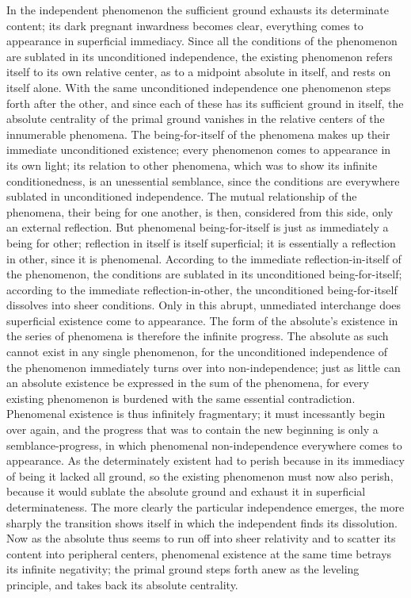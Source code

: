\documentclass[12pt,a4paper,openany]{book}
\newcommand{\opage}[1]{\marginnote{\footnotesize\textit{[#1]}}}
\begin{document}
In the independent phenomenon the sufficient
ground exhausts its determinate content; its dark pregnant
inwardness becomes clear, everything comes to appearance in
superficial immediacy. Since all the conditions of the phenomenon are sublated in its unconditioned independence,
the existing phenomenon refers itself to its own
relative center, as to a midpoint absolute in itself,
and rests on itself alone. With the same unconditioned
independence one phenomenon steps forth after the
other, and since each of these has its sufficient
ground in itself, the absolute centrality of the primal ground vanishes
in the relative centers of the innumerable phenomena.
The being-for-itself of the phenomena makes up their immediate
unconditioned existence; every phenomenon comes to appearance
in its own light; its relation to other phenomena,
which was to show its infinite conditionedness, is an unessential
semblance, since the conditions are everywhere sublated
in unconditioned independence. The mutual
relationship of the phenomena, their being for one another, is then, considered from
this side, only an external reflection.
But phenomenal being-for-itself is just as immediately
a being for other; reflection in itself is itself
superficial; it is essentially a reflection in other,
since it is phenomenal. According to the immediate
reflection-in-itself of the phenomenon, the conditions are sublated in
its unconditioned being-for-itself; according to the immediate
reflection-in-other, the unconditioned being-for-itself dissolves
into sheer conditions. Only in this abrupt, unmediated
interchange does superficial existence come to appearance.
The form of the absolute's existence in the series
of phenomena is therefore the infinite progress. The absolute
as such cannot exist in any single phenomenon,
for the unconditioned independence of the phenomenon
\setcounter{footnote}{0}%
\opage{161}immediately turns over into non-independence; just as little can an absolute
existence be expressed in the sum of the phenomena, for
every existing phenomenon is burdened with the same
essential contradiction. Phenomenal existence
is thus infinitely fragmentary; it must incessantly
begin over again, and the progress that was to contain
the new beginning is only a semblance-progress, in which
phenomenal non-independence everywhere comes to appearance.
As the determinately existent had to perish
because in its immediacy of being it lacked all
ground, so the existing phenomenon must now also
perish, because it would sublate the absolute ground and exhaust it in superficial
determinateness. The more clearly
the particular independence emerges, the more sharply
the transition shows itself in which the independent
finds its dissolution. Now as the absolute thus
seems to run off into sheer relativity and to scatter its
content into peripheral centers, phenomenal
existence at the same time betrays its infinite negativity;
the primal ground steps forth anew as the leveling
principle, and takes back its absolute centrality.
\end{document}
